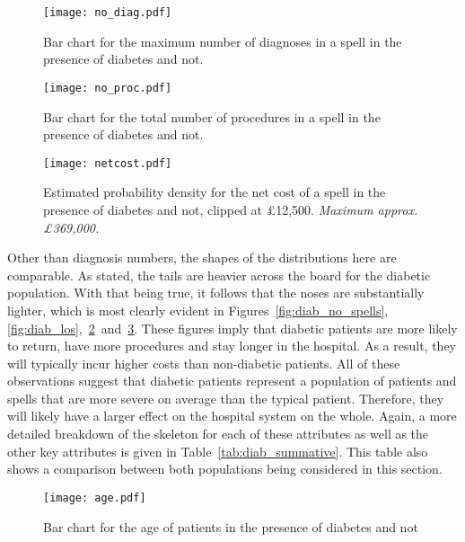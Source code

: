 \begin{figure}[htbp]
    \centering
    \texttt{[image: no\_diag.pdf]}
    \caption{Bar chart for the maximum number of diagnoses in a spell in the
        presence of diabetes and not.}%
    \label{fig:diab_no_diag}
\end{figure}

\begin{figure}[htbp]
    \centering
    \texttt{[image: no\_proc.pdf]}
    \caption{Bar chart for the total number of procedures in a spell in the
        presence of diabetes and not.}%
    \label{fig:diab_no_proc}
\end{figure}

\begin{figure}[htbp]
    \centering
    \texttt{[image: netcost.pdf]}
    \caption{Estimated probability density for the net cost of a spell in the
        presence of diabetes and not, clipped at \pounds12,500. \textit{Maximum
        approx. \pounds369,000.}}%
    \label{fig:diab_netcost}
\end{figure}

Other than diagnosis numbers, the shapes of the distributions here are
comparable. As stated, the tails are heavier across the board for the diabetic
population. With that being true, it follows that the noses are substantially
lighter, which is most clearly evident in Figures~\ref{fig:diab_no_spells},~%
\ref{fig:diab_los},~\ref{fig:diab_no_proc}~and~\ref{fig:diab_netcost}. These
figures imply that diabetic patients are more likely to return, have more
procedures and stay longer in the hospital. As a result, they will typically
incur higher costs than non-diabetic patients. All of these observations suggest
that diabetic patients represent a population of patients and spells that are
more severe on average than the typical patient. Therefore, they will likely
have a larger effect on the hospital system on the whole. Again, a more detailed
breakdown of the skeleton for each of these attributes as well as the other key
attributes is given in Table~\ref{tab:diab_summative}. This table also shows a
comparison between both populations being considered in this section.

\begin{figure}[htbp]
    \centering
    \texttt{[image: age.pdf]}
    \caption{Bar chart for the age of patients in the presence of diabetes and
        not}%
    \label{fig:diab_age}
\end{figure}

